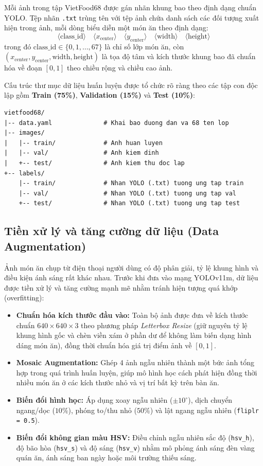 \documentclass[../main.tex]{subfiles}
\begin{document}
Mỗi ảnh trong tập VietFood68 được gán nhãn khung bao theo định dạng chuẩn YOLO. Tệp nhãn \texttt{.txt} trùng tên với tệp ảnh chứa danh sách các đối tượng xuất hiện trong ảnh, mỗi dòng biểu diễn một món ăn theo định dạng:
\begin{equation}
    \langle \text{class\_id} \rangle \quad \langle x_{\text{center}} \rangle \quad \langle y_{\text{center}} \rangle \quad \langle \text{width} \rangle \quad \langle \text{height} \rangle
\end{equation}
trong đó $\text{class\_id} \in \{0, 1, \dots, 67\}$ là chỉ số lớp món ăn, còn $(x_{\text{center}}, y_{\text{center}}, \text{width}, \text{height})$ là tọa độ tâm và kích thước khung bao đã chuẩn hóa về đoạn $[0, 1]$ theo chiều rộng và chiều cao ảnh.

Cấu trúc thư mục dữ liệu huấn luyện được tổ chức rõ ràng theo các tập con độc lập gồm \textbf{Train (75\%)}, \textbf{Validation (15\%)} và \textbf{Test (10\%)}:
\begin{verbatim}
vietfood68/
|-- data.yaml              # Khai bao duong dan va 68 ten lop
|-- images/
|   |-- train/             # Anh huan luyen
|   |-- val/               # Anh kiem dinh
|   +-- test/              # Anh kiem thu doc lap
+-- labels/
    |-- train/             # Nhan YOLO (.txt) tuong ung tap train
    |-- val/               # Nhan YOLO (.txt) tuong ung tap val
    +-- test/              # Nhan YOLO (.txt) tuong ung tap test
\end{verbatim}

\subsection{Tiền xử lý và tăng cường dữ liệu (Data Augmentation)}

Ảnh món ăn chụp từ điện thoại người dùng có độ phân giải, tỷ lệ khung hình và điều kiện ánh sáng rất khác nhau. Trước khi đưa vào mạng YOLOv11m, dữ liệu được tiền xử lý và tăng cường mạnh mẽ nhằm tránh hiện tượng quá khớp (overfitting):
\begin{itemize}
    \item \textbf{Chuẩn hóa kích thước đầu vào:} Toàn bộ ảnh được đưa về kích thước chuẩn $640 \times 640 \times 3$ theo phương pháp \textit{Letterbox Resize} (giữ nguyên tỷ lệ khung hình gốc và chèn viền xám ở phần dư để không làm biến dạng hình dáng món ăn), đồng thời chuẩn hóa giá trị điểm ảnh về $[0, 1]$.
    \item \textbf{Mosaic Augmentation:} Ghép 4 ảnh ngẫu nhiên thành một bức ảnh tổng hợp trong quá trình huấn luyện, giúp mô hình học cách phát hiện đồng thời nhiều món ăn ở các kích thước nhỏ và vị trí bất kỳ trên bàn ăn.
    \item \textbf{Biến đổi hình học:} Áp dụng xoay ngẫu nhiên ($\pm 10^\circ$), dịch chuyển ngang/dọc ($10\%$), phóng to/thu nhỏ ($50\%$) và lật ngang ngẫu nhiên (\texttt{fliplr = 0.5}).
    \item \textbf{Biến đổi không gian màu HSV:} Điều chỉnh ngẫu nhiên sắc độ (\texttt{hsv\_h}), độ bão hòa (\texttt{hsv\_s}) và độ sáng (\texttt{hsv\_v}) nhằm mô phỏng ánh sáng đèn vàng quán ăn, ánh sáng ban ngày hoặc môi trường thiếu sáng.
\end{itemize}
\end{document}
